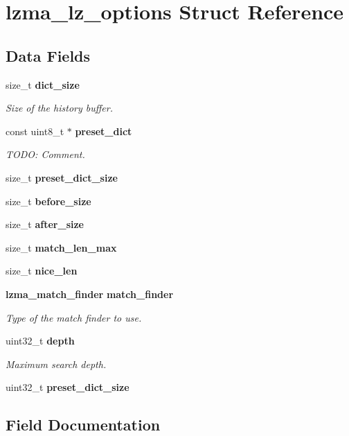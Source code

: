 \section{lzma\-\_\-lz\-\_\-options Struct Reference}
\label{structlzma__lz__options}
\subsection*{Data Fields}
\begin{DoxyCompactItemize}
\item 
size\-\_\-t {\bf dict\-\_\-size}
\begin{DoxyCompactList}\small\item\em Size of the history buffer. \end{DoxyCompactList}\item 
const uint8\-\_\-t $\ast$ {\bf preset\-\_\-dict}
\begin{DoxyCompactList}\small\item\em T\-O\-D\-O\-: Comment. \end{DoxyCompactList}\item 
size\-\_\-t {\bfseries preset\-\_\-dict\-\_\-size}\label{structlzma__lz__options_a0f3f942900114d44fcc720dd27492953}

\item 
size\-\_\-t {\bf before\-\_\-size}
\item 
size\-\_\-t {\bf after\-\_\-size}
\item 
size\-\_\-t {\bf match\-\_\-len\-\_\-max}
\item 
size\-\_\-t {\bf nice\-\_\-len}
\item 
{\bf lzma\-\_\-match\-\_\-finder} {\bf match\-\_\-finder}
\begin{DoxyCompactList}\small\item\em Type of the match finder to use. \end{DoxyCompactList}\item 
uint32\-\_\-t {\bf depth}
\begin{DoxyCompactList}\small\item\em Maximum search depth. \end{DoxyCompactList}\item 
uint32\-\_\-t {\bfseries preset\-\_\-dict\-\_\-size}\label{structlzma__lz__options_adc40b285d46c70ce858d753b074c5b1f}

\end{DoxyCompactItemize}


\subsection{Field Documentation}
